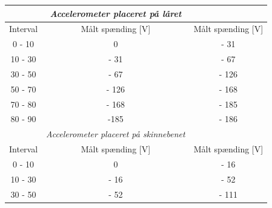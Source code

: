 \begin{table}[H]
\centering
\begin{tabular}{lcc}
                               & \textit{Accelerometer placeret på låret}                           & \multicolumn{1}{l}{}                       \\ \hline
\multicolumn{1}{|c|}{Interval} & \multicolumn{1}{c|}{Målt spænding {[}V{]}}                         & \multicolumn{1}{l|}{Målt spænding {[}V{]}} \\ \hline
\multicolumn{1}{|c|}{0 - 10}   & \multicolumn{1}{c|}{0}                                             & \multicolumn{1}{c|}{- 31}                  \\ \hline
\multicolumn{1}{|c|}{10 - 30}  & \multicolumn{1}{c|}{- 31}                                          & \multicolumn{1}{c|}{- 67}                  \\ \hline
\multicolumn{1}{|c|}{30 - 50}  & \multicolumn{1}{c|}{- 67}                                          & \multicolumn{1}{c|}{- 126}                 \\ \hline
\multicolumn{1}{|c|}{50 - 70}  & \multicolumn{1}{c|}{- 126}                                         & \multicolumn{1}{c|}{- 168}                 \\ \hline
\multicolumn{1}{|c|}{70 - 80}  & \multicolumn{1}{c|}{- 168}                                         & \multicolumn{1}{c|}{- 185}                 \\ \hline
\multicolumn{1}{|c|}{80 - 90}  & \multicolumn{1}{c|}{-185}                                          & \multicolumn{1}{c|}{- 186}                 \\ \hline
                               & \multicolumn{1}{l}{\textit{Accelerometer placeret på skinnebenet}} & \multicolumn{1}{c}{}                       \\ \hline
\multicolumn{1}{|c|}{Interval} & \multicolumn{1}{c|}{Målt spænding {[}V{]}}                         & \multicolumn{1}{c|}{Målt spænding {[}V{]}} \\ \hline
\multicolumn{1}{|c|}{0 - 10}   & \multicolumn{1}{c|}{0}                                             & \multicolumn{1}{c|}{- 16}                  \\ \hline
\multicolumn{1}{|c|}{10 - 30}  & \multicolumn{1}{c|}{- 16}                                          & \multicolumn{1}{c|}{- 52}                  \\ \hline
\multicolumn{1}{|c|}{30 - 50}  & \multicolumn{1}{c|}{- 52}                                          & \multicolumn{1}{c|}{- 111}                 \\ \hline

\end{tabular}
\end{table}
